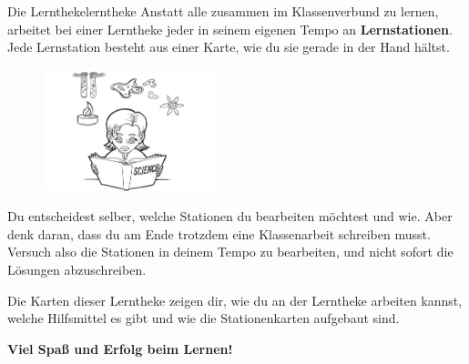 \documentclass[lerntheke,12pt,a5paper,landscape]{arbeitsblatt}
\begin{document}
\begin{hilfekarte}{Die Lerntheke}{lerntheke}
	Anstatt alle zusammen im Klassenverbund zu lernen, arbeitet bei einer Lerntheke jeder in seinem eigenen Tempo an \textbf{Lernstationen}. Jede Lernstation besteht aus einer Karte, wie du sie gerade in der Hand hältst.

	\medskip
	\begin{figure}
	\includegraphics[width=5cm]{0.1-LT-Abb_Lernen}
	\end{figure}
	Du entscheidest selber, welche Stationen du bearbeiten möchtest und wie. Aber denk daran, dass du am Ende trotzdem eine Klassenarbeit schreiben musst. Versuch also die Stationen in deinem Tempo zu bearbeiten, und nicht sofort die Lösungen abzuschreiben.

	\medskip
	Die Karten dieser Lerntheke zeigen dir, wie du an der Lerntheke arbeiten kannst, welche Hilfsmittel es gibt und wie die Stationenkarten aufgebaut sind.

	\medskip
	\begin{center}\large\bfseries
		Viel Spaß und Erfolg beim Lernen!
	\end{center}
\end{hilfekarte}
\end{document}
